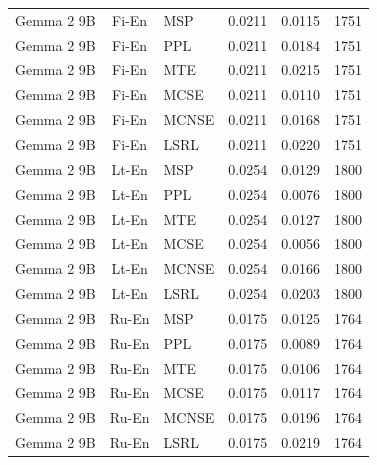 \begin{table}
\begin{tabular}{lc}
Gemma 2 9B & Fi-En & MSP & 0.0211 & 0.0115 & 1751 \\
Gemma 2 9B & Fi-En & PPL & 0.0211 & 0.0184 & 1751 \\
Gemma 2 9B & Fi-En & MTE & 0.0211 & 0.0215 & 1751 \\
Gemma 2 9B & Fi-En & MCSE & 0.0211 & 0.0110 & 1751 \\
Gemma 2 9B & Fi-En & MCNSE & 0.0211 & 0.0168 & 1751 \\
Gemma 2 9B & Fi-En & LSRL & 0.0211 & 0.0220 & 1751 \\
Gemma 2 9B & Lt-En & MSP & 0.0254 & 0.0129 & 1800 \\
Gemma 2 9B & Lt-En & PPL & 0.0254 & 0.0076 & 1800 \\
Gemma 2 9B & Lt-En & MTE & 0.0254 & 0.0127 & 1800 \\
Gemma 2 9B & Lt-En & MCSE & 0.0254 & 0.0056 & 1800 \\
Gemma 2 9B & Lt-En & MCNSE & 0.0254 & 0.0166 & 1800 \\
Gemma 2 9B & Lt-En & LSRL & 0.0254 & 0.0203 & 1800 \\
Gemma 2 9B & Ru-En & MSP & 0.0175 & 0.0125 & 1764 \\
Gemma 2 9B & Ru-En & PPL & 0.0175 & 0.0089 & 1764 \\
Gemma 2 9B & Ru-En & MTE & 0.0175 & 0.0106 & 1764 \\
Gemma 2 9B & Ru-En & MCSE & 0.0175 & 0.0117 & 1764 \\
Gemma 2 9B & Ru-En & MCNSE & 0.0175 & 0.0196 & 1764 \\
Gemma 2 9B & Ru-En & LSRL & 0.0175 & 0.0219 & 1764 \\
\midrule
\end{tabular}
\end{table}

